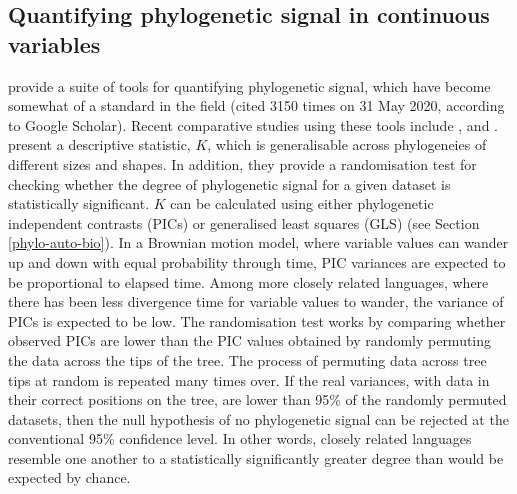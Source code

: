 \hypertarget{phylo-sig-quant}{%
\subsection{Quantifying phylogenetic signal in continuous variables}\label{phylo-sig-quant}}

\textcite{blomberg_testing_2003} provide a suite of tools for quantifying phylogenetic signal, which have become somewhat of a standard in the field (cited 3150 times on 31 May 2020, according to Google Scholar). Recent comparative studies using these tools include \textcite{balisi_dietary_2018}, \textcite{hutchinson_contemporary_2018} and \textcite{leff_predicting_2018}. \textcite{blomberg_testing_2003} present a descriptive statistic, \(K\), which is generalisable across phylogeneies of different sizes and shapes. In addition, they provide a randomisation test for checking whether the degree of phylogenetic signal for a given dataset is statistically significant. \(K\) can be calculated using either phylogenetic independent contrasts (PICs) \autocite{felsenstein_phylogenies_1985} or generalised least squares (GLS) \autocite{grafen_phylogenetic_1989} (see Section \ref{phylo-auto-bio}). In a Brownian motion model, where variable values can wander up and down with equal probability through time, PIC variances are expected to be proportional to elapsed time. Among more closely related languages, where there has been less divergence time for variable values to wander, the variance of PICs is expected to be low. The randomisation test works by comparing whether observed PICs are lower than the PIC values obtained by randomly permuting the data across the tips of the tree. The process of permuting data across tree tips at random is repeated many times over. If the real variances, with data in their correct positions on the tree, are lower than 95\% of the randomly permuted datasets, then the null hypothesis of no phylogenetic signal can be rejected at the conventional 95\% confidence level. In other words, closely related languages resemble one another to a statistically significantly greater degree than would be expected by chance.


